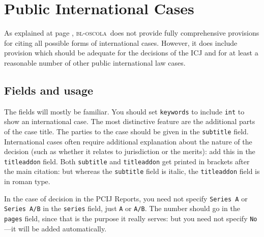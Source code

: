 \documentclass[a4paper,
               11pt,
	       DIV=1,			   
	       footinclude=false]
	      {scrartcl}
\newcommand{\oscola}{\textsc{bl-oscola}}
\begin{document}
\section{Public International Cases}

As explained at page \pageref{scope}, \oscola\ does not provide
fully comprehensive provisions for citing all possible forms of
international cases. However, it does include provision which should
be adequate for the decisions of the ICJ and for at least a reasonable
number of other public international law cases.

\subsection{Fields and usage}

The fields will mostly be familiar. You should set \texttt{keywords}
to include \texttt{int} to show an international case. The most
distinctive feature are the additional parts of the case title. The
parties to the case should be given in the \texttt{subtitle}
field.
International cases often require additional explanation about
the nature of the decision (such as whether it relates to jurisdiction
or the merits): add this in the \texttt{titleaddon} field. Both
\texttt{subtitle} and \texttt{titleaddon} get printed in brackets
after the main citation: but whereas the \texttt{subtitle} field is
italic, the \texttt{titleaddon} field is in roman type.

In the case of decision in the PCIJ Reports, you need not specify
\texttt{Series A} or \texttt{Series A/B} in the \texttt{series} field,
just \texttt{A} or \texttt{A/B}. The number should go in the
\texttt{pages} field, since that is the purpose it really serves: but
you need not specify \texttt{No}---it will be added automatically.
\end{document}
